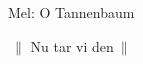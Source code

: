 \begin{SongText}
    \begin{SongInfo}
        Mel: O Tannenbaum
    \end{SongInfo}
    \begin{SongVerse}
        $\:\|$ Nu tar vi den$\:\|$
    \end{SongVerse}
\end{SongText}
